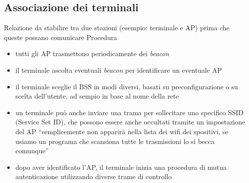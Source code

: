 \documentclass{book}
\begin{document}
\subsection{Associazione dei terminali}
\begin{tasks}
  \task Relazione da stabilire tra due stazioni (esempio: terminale e AP) prima che queste possano comunicare
  \task Procedura
  \begin{itemize}
  \item tutti gli AP trasmettono periodicamente dei {\it beacon}
  \item il terminale ascolta eventuali {\it beacon} per identificare un eventuale AP
  \item il terminale sceglie il BSS in modi diversi, basati su preconfigurazione o su scelta dell'utente, ad sempio in base al nome della rete
  \item un terminale può anche inviare una trama per sollecitare uno specifico SSID (Service Set ID), che possono essere anche occultati tramite un impostazione del AP ``semplicemente non apparirà nella lista dei wifi dei spositivi, se usiamo un programa che scansiona tutte le trasmissioni lo si becca comunque'' 
  \item dopo aver identificato l'AP, il terminale inizia una procedura di mutua autenticazione utilizzando diverse trame di controllo
  \end{itemize}
\end{tasks}
\end{document}
